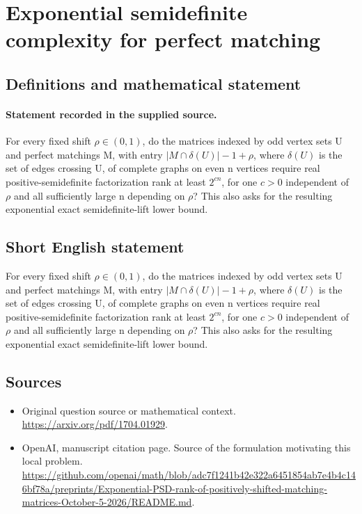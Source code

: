\documentclass[11pt]{article}
\begin{document}
\section*{Exponential semidefinite complexity for perfect matching}\label{30007462}
\subsection{Definitions and mathematical statement}
\paragraph{Statement recorded in the supplied source.}
For every fixed shift $\rho \in (0,1)$, do the matrices indexed by odd vertex sets U and perfect matchings M, with entry $|M\cap \delta (U)|-1+\rho $, where $\delta (U)$ is the set of edges crossing U, of complete graphs on even n vertices require real positive-semidefinite factorization rank at least $2^{cn}$, for one $c>0$ independent of $\rho $ and all sufficiently large n depending on $\rho $? This also asks for the resulting exponential exact semidefinite-lift lower bound.
\subsection{Short English statement}
For every fixed shift $\rho \in (0,1)$, do the matrices indexed by odd vertex sets U and perfect matchings M, with entry $|M\cap \delta (U)|-1+\rho $, where $\delta (U)$ is the set of edges crossing U, of complete graphs on even n vertices require real positive-semidefinite factorization rank at least $2^{cn}$, for one $c>0$ independent of $\rho $ and all sufficiently large n depending on $\rho $? This also asks for the resulting exponential exact semidefinite-lift lower bound.
\subsection{Sources}
\begin{itemize}
\item[S1] Original question source or mathematical context.
\url{https://arxiv.org/pdf/1704.01929}.
\item[S2] OpenAI, manuscript citation page. Source of the formulation motivating this local problem.
\url{https://github.com/openai/math/blob/adc7f1241b42e322a6451854ab7e4b4c146bf78a/preprints/Exponential-PSD-rank-of-positively-shifted-matching-matrices-October-5-2026/README.md}.
\end{itemize}
\end{document}
